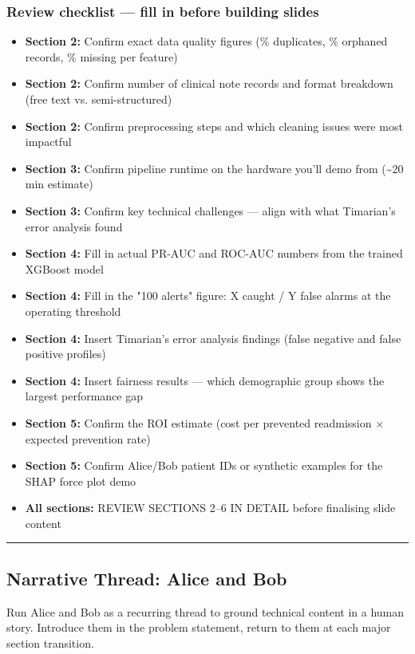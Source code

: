 \documentclass[11pt,a4paper]{article}
\begin{document}
\subsubsection{Review checklist --- fill in before building slides}
\begin{itemize}
\item [ ] \textbf{Section 2:} Confirm exact data quality figures (\% duplicates, \% orphaned records, \% missing per feature)
\item [ ] \textbf{Section 2:} Confirm number of clinical note records and format breakdown (free text vs. semi-structured)
\item [ ] \textbf{Section 2:} Confirm preprocessing steps and which cleaning issues were most impactful
\item [ ] \textbf{Section 3:} Confirm pipeline runtime on the hardware you'll demo from (\textasciitilde{}20 min estimate)
\item [ ] \textbf{Section 3:} Confirm key technical challenges --- align with what Timarian's error analysis found
\item [ ] \textbf{Section 4:} Fill in actual PR-AUC and ROC-AUC numbers from the trained XGBoost model
\item [ ] \textbf{Section 4:} Fill in the "100 alerts" figure: X caught / Y false alarms at the operating threshold
\item [ ] \textbf{Section 4:} Insert Timarian's error analysis findings (false negative and false positive profiles)
\item [ ] \textbf{Section 4:} Insert fairness results --- which demographic group shows the largest performance gap
\item [ ] \textbf{Section 5:} Confirm the ROI estimate (cost per prevented readmission $\times$ expected prevention rate)
\item [ ] \textbf{Section 5:} Confirm Alice/Bob patient IDs or synthetic examples for the SHAP force plot demo
\item [ ] \textbf{All sections:} REVIEW SECTIONS 2--6 IN DETAIL before finalising slide content
\end{itemize}

\noindent\rule{\linewidth}{0.4pt}

\subsection{Narrative Thread: Alice and Bob}

Run Alice and Bob as a recurring thread to ground technical content in a human story. Introduce them in the problem statement, return to them at each major section transition.
\end{document}
